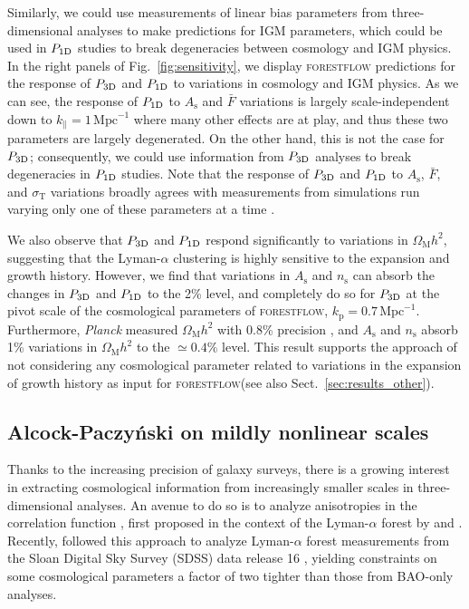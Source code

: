 \documentclass[longauth]{aa}
\newcommand{\lya}{Lyman-$\alpha$\xspace}
\newcommand{\lyaf}{Lyman-$\alpha$ forest\xspace}
\newcommand{\poned}{\ensuremath{P_{\rm 1D}}\xspace}
\newcommand{\pthreed}{\ensuremath{P_{\rm 3D}}\xspace}
\newcommand{\forestflow}{\textsc{forestflow}\xspace}
\newcommand{\iMpc}{\ensuremath{\,\mathrm{Mpc}^{-1}}}
\begin{document}
Similarly, we could use measurements of linear bias parameters from three-dimensional analyses \citep{dumasdesbourboux2020CompletedSDSSIVExtended, desicollaboration2024DESI2024IV} to make predictions for IGM parameters, which could be used in \poned studies to break degeneracies between cosmology and IGM physics. In the right panels of Fig.~\ref{fig:sensitivity}, we display \forestflow predictions for the response of \pthreed and \poned to variations in cosmology and IGM physics. As we can see, the response of \poned to $A_\mathrm{s}$ and $\bar{F}$ variations is largely scale-independent down to $k_\parallel=1\iMpc$ where many other effects are at play, and thus these two parameters are largely degenerated. On the other hand, this is not the case for \pthreed; consequently, we could use information from \pthreed analyses to break degeneracies in \poned studies. Note that the response of \pthreed and \poned to $A_\mathrm{s}$, $\bar{F}$, and $\sigma_\mathrm{T}$ variations broadly agrees with measurements from simulations run varying only one of these parameters at a time \citep{mcdonald2003MeasurementCosmologicalGeometry, mcdonald2005LinearTheoryPower}.

We also observe that \pthreed and \poned respond significantly to variations in $\Omega_\mathrm{M}h^2$, suggesting that the \lya clustering is highly sensitive to the expansion and growth history. However, we find that variations in $A_\mathrm{s}$ and $n_\mathrm{s}$ can absorb the changes in \pthreed and \poned to the 2\% level, and completely do so for \pthreed at the pivot scale of the cosmological parameters of \forestflow, $k_\mathrm{p}=0.7\iMpc$. Furthermore, {\it Planck} measured $\Omega_\mathrm{M}h^2$ with 0.8\% precision \citet{planckcollaboration2020Planck2018Resultsa}, and $A_\mathrm{s}$ and $n_\mathrm{s}$ absorb 1\% variations in $\Omega_\mathrm{M}h^2$ to the $\simeq0.4\%$ level. This result supports the approach of not considering any cosmological parameter related to variations in the expansion of growth history as input for \forestflow (see also Sect.~\ref{sec:results_other}).



\subsection{Alcock-Paczy\'nski on mildly nonlinear scales}

Thanks to the increasing precision of galaxy surveys, there is a growing interest in extracting cosmological information from increasingly smaller scales in three-dimensional analyses. An avenue to do so is to analyze anisotropies in the correlation function \citet[AP test;][]{alcock1979EvolutionFreeTesta}, first proposed in the context of the \lyaf by \citet{1999ApJ...518...24M} and \citet{hui1999GeometricalTestCosmological}. Recently, \cite{cuceu2023ConstraintsCosmicExpansion} followed this approach to analyze \lyaf measurements from the Sloan Digital Sky Survey (SDSS) data release 16 \citep[DR16;][]{Ahumada2020_DR16}, yielding constraints on some cosmological parameters a factor of two tighter than those from BAO-only analyses. 
\end{document}

